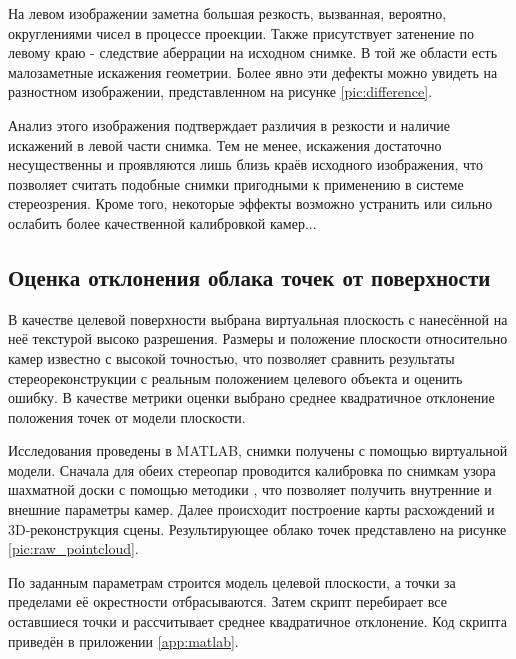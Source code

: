 
На левом изображении заметна большая резкость, вызванная, вероятно, округлениями чисел в процессе проекции. Также присутствует 
затенение по левому краю - следствие аберрации на исходном снимке. В той же области есть малозаметные искажения геометрии. Более 
явно эти дефекты можно увидеть на разностном изображении, представленном на рисунке \ref{pic:difference}. 


Анализ этого изображения подтверждает различия в резкости и наличие искажений в левой части снимка. Тем не менее, искажения
достаточно несущественны и проявляются лишь близь краёв исходного изображения, что позволяет считать подобные снимки пригодными 
к применению в системе стереозрения.  Кроме того, некоторые эффекты возможно устранить или  сильно ослабить более качественной 
калибровкой камер... %

\subsection{Оценка отклонения облака точек от поверхности}  %

В качестве целевой поверхности выбрана виртуальная плоскость с нанесённой на неё текстурой высоко разрешения. Размеры и
положение плоскости относительно камер известно с высокой точностью, что позволяет сравнить результаты стереореконструкции
с реальным положением целевого объекта и оценить ошибку. В качестве метрики оценки выбрано среднее квадратичное отклонение
положения точек от модели плоскости. 

Исследования проведены в MATLAB, снимки получены с помощью виртуальной модели. Сначала для обеих стереопар проводится
калибровка по снимкам узора шахматной доски с помощью методики \cite{stereo_calib}, что позволяет получить 
внутренние и внешние параметры камер. %
Далее происходит построение карты расхождений \cite{SGBM} и 3D-реконструкция сцены. Результирующее облако точек 
представлено на рисунке
\ref{pic:raw_pointcloud}.

По заданным параметрам строится модель целевой плоскости, а точки за пределами её окрестности отбрасываются. %
Затем скрипт перебирает все оставшиеся точки и рассчитывает среднее квадратичное отклонение. Код скрипта приведён
 в приложении \ref{app:matlab}.

